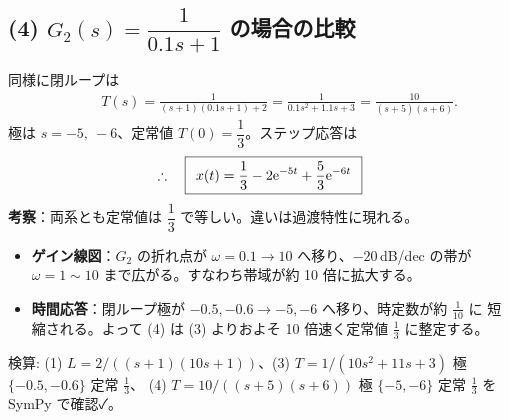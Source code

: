 \documentclass[11pt,a4paper]{article}
\begin{document}
\subsection*{(4) $G_2(s)=\dfrac{1}{0.1s+1}$ の場合の比較}
同様に閉ループは
\begin{align*}
  &\qquad T(s)=\frac{1}{(s+1)(0.1s+1)+2}=\frac{1}{0.1s^2+1.1s+3}=\frac{10}{(s+5)(s+6)}.
\end{align*}
極は $s=-5,\ -6$、定常値 $T(0)=\dfrac13$。ステップ応答は
\[
  \therefore\quad \boxed{\,\;x(t)=\dfrac13-2\mathrm{e}^{-5t}+\dfrac53\mathrm{e}^{-6t}\;\,}
\]
\textbf{考察}：両系とも定常値は $\dfrac13$ で等しい。違いは過渡特性に現れる。
\begin{itemize}\setlength{\itemsep}{1pt}
  \item \textbf{ゲイン線図}：$G_2$ の折れ点が $\omega=0.1\to10$ へ移り、$-20\,$dB/dec の帯が
        $\omega=1\!\sim\!10$ まで広がる。すなわち帯域が約 10 倍に拡大する。
  \item \textbf{時間応答}：閉ループ極が $-0.5,-0.6\to-5,-6$ へ移り、時定数が約 $\tfrac{1}{10}$ に
        短縮される。よって (4) は (3) よりおよそ 10 倍速く定常値 $\tfrac13$ に整定する。
\end{itemize}

\bigskip
\noindent 検算: (1) $L=2/((s+1)(10s+1))$、(3) $T=1/(10s^2+11s+3)$ 極 $\{-0.5,-0.6\}$ 定常 $\tfrac13$、
(4) $T=10/((s+5)(s+6))$ 極 $\{-5,-6\}$ 定常 $\tfrac13$ を SymPy で確認✓。
\end{document}
